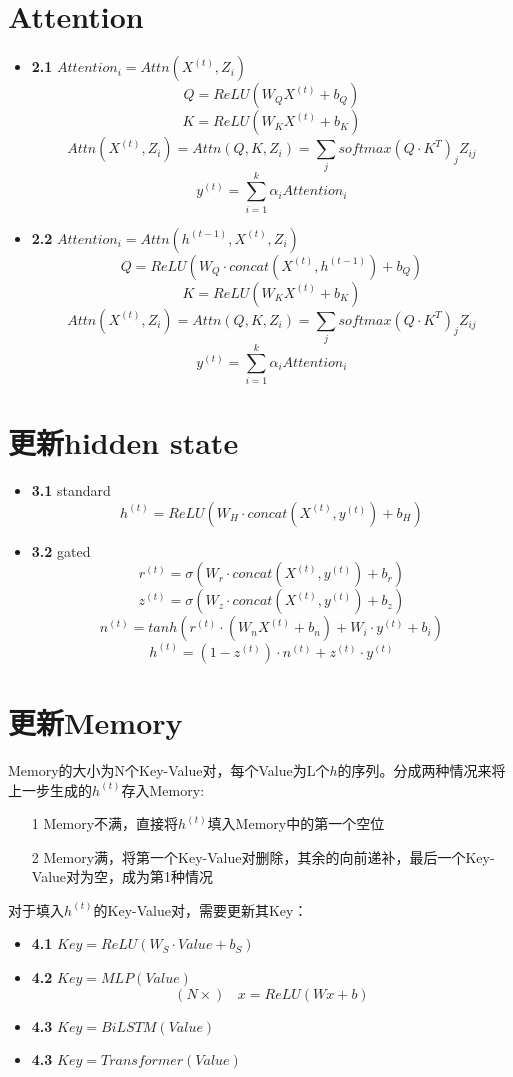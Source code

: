 \documentclass{article}
\begin{document}
\section{Attention}
	\begin{itemize}
		\item \textbf{2.1} $Attention_i = Attn(X^{(t)}, Z_i)$
			$$Q = ReLU(W_QX^{(t)} + b_Q)$$
			$$K = ReLU(W_KX^{(t)} + b_K)$$
			$$Attn(X^{(t)}, Z_i) = Attn(Q, K, Z_i)  = \sum_j softmax(Q\cdot K^T)_jZ_{ij}$$
			$$y^{(t)} = \sum_{i=1}^k \alpha_i Attention_i$$
		\item \textbf{2.2} $Attention_i = Attn(h^{(t-1)},X^{(t)}, Z_i)$
			$$Q = ReLU(W_Q\cdot concat(X^{(t)}, h^{(t-1)}) + b_Q)$$
			$$K = ReLU(W_KX^{(t)} + b_K)$$
			$$Attn(X^{(t)}, Z_i) = Attn(Q, K, Z_i)  = \sum_j softmax(Q\cdot K^T)_jZ_{ij}$$
			$$y^{(t)} = \sum_{i=1}^k \alpha_i Attention_i$$
	\end{itemize}
\section{更新hidden state}
	\begin{itemize}
		\item \textbf{3.1} standard
			$$h^{(t)} = ReLU(W_H\cdot concat(X^{(t)}, y^{(t)}) + b_H)$$
		\item \textbf{3.2} gated
			$$ r^{(t)} = \sigma(W_r \cdot concat(X^{(t)}, y^{(t)}) + b_r) $$
			$$ z^{(t)} = \sigma(W_z \cdot concat(X^{(t)}, y^{(t)}) + b_z) $$
			$$ n^{(t)} = tanh(r^{(t)} \cdot (W_nX^{(t)} + b_n) + W_i \cdot y^{(t)} + b_i) $$
			$$ h^{(t)} = (1 - z^{(t)})\cdot n^{(t)} + z^{(t)} \cdot y^{(t)}$$
	\end{itemize}
\section{更新Memory}
	Memory的大小为N个Key-Value对，每个Value为L个$h$的序列。分成两种情况来将上一步生成的$h^{(t)}$存入Memory:
	\begin{itemize}
		\item[1] Memory不满，直接将$h^{(t)}$填入Memory中的第一个空位
		\item[2] Memory满，将第一个Key-Value对删除，其余的向前递补，最后一个Key-Value对为空，成为第1种情况
	\end{itemize}
	对于填入$h^{(t)}$的Key-Value对，需要更新其Key：
	\begin{itemize}
		\item \textbf{4.1} $Key = ReLU(W_S\cdot Value + b_S)$
		\item \textbf{4.2} $Key = MLP(Value)$
			$$(N \times)\ \ \ \  x = ReLU(Wx + b)$$
		\item \textbf{4.3} $Key = BiLSTM(Value)$
		\item \textbf{4.3} $Key = Transformer(Value)$
	\end{itemize}


\end{document}
